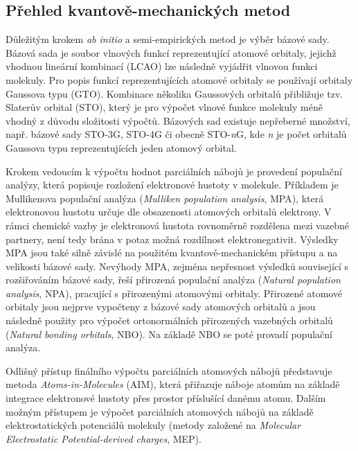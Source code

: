 \subsection{Přehled kvantově-mechanických metod}
Důležitým krokem \textit{ab initio} a semi-empirických metod je výběr bázové sady. Bázová sada je soubor vlnových funkcí reprezentující atomové orbitaly, jejichž vhodnou lineární kombinací (LCAO) lze následně vyjádřit vlnovou funkci molekuly. %
Pro popis funkcí reprezentujících atomové orbitaly se používají orbitaly Gaussova typu (GTO). Kombinace několika Gaussových orbitalů přibližuje tzv. Slaterův orbital (STO), který je pro výpočet vlnové funkce molekuly méně vhodný z důvodu složitosti výpočtů. Bázových sad existuje nepřeberné množství, např. bázové sady STO-3G, STO-4G či obecně STO-\textit{n}G, kde \textit{n} je počet orbitalů Gaussova typu reprezentujících jeden atomový orbital.

Krokem vedoucím k výpočtu hodnot parciálních nábojů je provedení populační analýzy, která popisuje rozložení elektronové hustoty v molekule. Příkladem je Mullikenova populační analýza (\textit{Mulliken population analysis}, MPA), %
která elektronovou hustotu určuje dle obsazenosti atomových orbitalů  elektrony. V rámci chemické vazby je elektronová hustota rovnoměrně rozdělena mezi vazebné partnery, není tedy brána v potaz možná rozdílnost elektronegativit. Výsledky MPA jsou také silně závislé na použitém kvantově-mechanickém přístupu a na velikosti bázové sady.
Nevýhody MPA, zejména nepřesnost výsledků související s rozšiřováním bázové sady, řeší přirozená populační analýza (\textit{Natural population analysis}, NPA), pracující s přirozenými atomovými orbitaly. 
Přirozené atomové orbitaly jsou nejprve vypočteny z bázové sady atomových orbitalů a jsou následně použity pro výpočet ortonormálních přirozených vazebných orbitalů (\textit{Natural bonding orbitals}, NBO). Na základě NBO se poté provadí populační analýza. %

Odlišný přístup finálního výpočtu parciálních atomových nábojů představuje metoda \textit{Atoms-in-Molecules} (AIM), která přiřazuje náboje atomům na základě integrace elektronové hustoty přes prostor příslušící danému atomu. Dalším možným přístupem je výpočet parciálních atomových nábojů na základě elektrostatických potenciálů molekuly (metody založené na \textit{Molecular Electrostatic Potential-derived charges}, MEP). 



